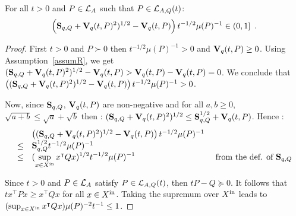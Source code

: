 \documentclass[10pt]{article}
\begin{document}
\begin{comment}
\begin{lemma}
For all $P$ satisfying Hypothesis~\eqref{hypo1}, $0\leq \alpha(Q,\xin) \alpha(P,\xin)^{-1}\lambda_1(Q)^{-1}\leq 1$. 
For all $P$ satisfying Hypothesis~\eqref{hypo2}, $0\leq \alpha(Q,\xin) \alpha(P,\xin)^{-1}\lambda_{d}(P)\lambda_1(Q)^{-1}\leq 1$.    
\end{lemma}
\end{comment}

\begin{lemma}
For all $t>0$ and $P\in\mathcal{L}_{A}$ such that $P\in\mathcal{L}_{A,Q}(t)$: \[
\left(\mathbf{S}_{q,Q}+\mathbf{V}_{q}(t,P)^2)^{1/2}-\mathbf{V}_{q}(t,P)\right) t^{-1/2}\mu(P)^{-1}\in (0,1]\enspace .
\]
\end{lemma}

\begin{proof}
First $t>0$ and $P\succ 0$ then $t^{-1/2}\mu(P)^{-1}>0$ and $\mathbf{V}_{q}(t,P)\geq 0$. Using Assumption~\ref{assumR}, we get $(\mathbf{S}_{q,Q}+\mathbf{V}_{q}(t,P)^2)^{1/2}-\mathbf{V}_{q}(t,P)> \mathbf{V}_{q}(t,P)-\mathbf{V}_{q}(t,P)=0$. We conclude that $\left((\mathbf{S}_{q,Q}+\mathbf{V}_{q}(t,P)^2)^{1/2}-\mathbf{V}_{q}(t,P)\right) t^{-1/2}\mu(P)^{-1}>0$. 

Now, since $\mathbf{S}_{q,Q}$, $\mathbf{V}_{q}(t,P)$ are non-negative and for all $a,b\geq 0$, $\sqrt{a+b}\leq \sqrt{a}+\sqrt{b}$  then : 
$(\mathbf{S}_{q,Q}+\mathbf{V}_{q}(t,P)^2)^{1/2}\leq \mathbf{S}_{q,Q}^{1/2}+\mathbf{V}_{q}(t,P)$. Hence : 
\[
\begin{array}{lll}
&\left((\mathbf{S}_{q,Q}+\mathbf{V}_{q}(t,P)^2)^{1/2}-\mathbf{V}_{q}(t,P)\right) t^{-1/2}\mu(P)^{-1}& \\
\leq &\mathbf{S}_{q,Q}^{1/2} t^{-1/2}\mu(P)^{-1} & \\
\leq &(\displaystyle{\sup_{x\in X^\mathrm{in}} x^\intercal Q x})^{1/2} t^{-1/2}\mu(P)^{-1} & \text{ from the def. of } \mathbf{S}_{q,Q}
\end{array}
\]

Since $t>0$ and $P\in\mathcal{L}_{A}$ satisfy $P\in\mathcal{L}_{A,Q}(t)$, then $t P-Q\succeq 0$. It follows that 
$t x^\intercal P x\geq x^\intercal Q x$ for all $x\in X^\mathrm{in}$. Taking the supremum over $X^\mathrm{in}$ leads to $(\sup_{x\in X^\mathrm{in}} x^\intercal Q x)\mu(P)^{-2}t^{-1} \leq 1$. 
\begin{comment}
Note that  $\alpha(Q,\xin) \alpha(P,\xin)^{-1}\lambda_1(Q)^{-1}$ is nonnegative since $P$ and $Q$ are positive semi-definite and thus each factor of the latter product is nonnegative.

Applying twice Lemma~\ref{lemma1}, we get $Q\preceq \lambda_1(Q) Id\preceq \lambda_1(Q)\lambda_d(P)^{-1} P$. Now taking $x\in\xin$,
we conclude that $\alpha(Q,\xin) \alpha(P,\xin)^{-1}\lambda_{d}(P)\lambda_1(Q)^{-1}\leq 1$. The fact that the latter product is nonnegative follows readily from the fact that $P$ and $Q$ are positive semidefinite.
\end{comment}
\end{proof}
\end{document}
